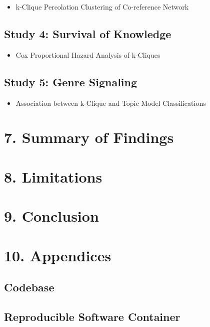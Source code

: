 \documentclass[]{article}
\providecommand{\tightlist}{%
  \setlength{\itemsep}{0pt}\setlength{\parskip}{0pt}}
\begin{document}
\begin{itemize}
\tightlist
\item
  k-Clique Percolation Clustering of Co-reference Network
\end{itemize}

\subsection{Study 4: Survival of
Knowledge}\label{study-4-survival-of-knowledge}

\begin{itemize}
\tightlist
\item
  Cox Proportional Hazard Analysis of k-Cliques
\end{itemize}

\subsection{Study 5: Genre Signaling}\label{study-5-genre-signaling}

\begin{itemize}
\tightlist
\item
  Association between k-Clique and Topic Model Classifications
\end{itemize}

\section{7. Summary of Findings}\label{summary-of-findings}

\section{8. Limitations}\label{limitations}

\section{9. Conclusion}\label{conclusion}

\section{10. Appendices}\label{appendices}

\subsection{Codebase}\label{codebase}

\subsection{Reproducible Software
Container}\label{reproducible-software-container}
\end{document}
